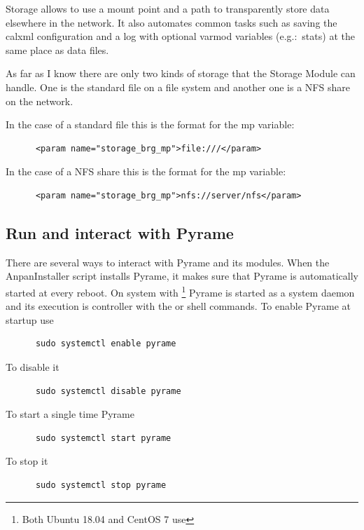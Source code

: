 Storage allows to use a mount point and a path to transparently store data
elsewhere in the network. It also automates common tasks such as saving the
calxml configuration and a log with optional varmod variables (e.g.:\ stats) at
the same place as data files.

As far as I know there are only two kinds of storage that the Storage Module can
handle. One is the standard file on a file system and another one is a NFS share
on the network.

In the case of a standard file this is the format for the mp variable:
\begin{lstlisting}
      <param name="storage_brg_mp">file:///</param>
\end{lstlisting}
In the case of a NFS share this is the format for the mp variable:
\begin{lstlisting}
      <param name="storage_brg_mp">nfs://server/nfs</param>
\end{lstlisting}


\subsection{Run and interact with Pyrame}
There are several ways to interact with Pyrame and its modules. When the
AnpanInstaller script installs Pyrame, it makes sure that Pyrame is
automatically started at every reboot. On system with
\footnote{Both Ubuntu 18.04 and CentOS 7 use
  } Pyrame is started as a system daemon and its execution
is controller with the  or  shell
commands. To enable Pyrame at startup use
\begin{lstlisting}
      sudo systemctl enable pyrame
\end{lstlisting}
To disable it
\begin{lstlisting}
      sudo systemctl disable pyrame
\end{lstlisting}
To start a single time Pyrame
\begin{lstlisting}
      sudo systemctl start pyrame
\end{lstlisting}
To stop it
\begin{lstlisting}
      sudo systemctl stop pyrame
\end{lstlisting}

